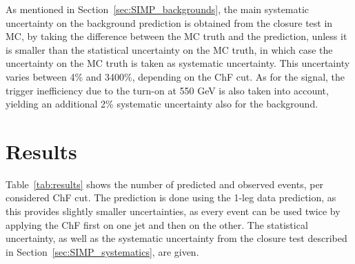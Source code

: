 As mentioned in Section~\ref{sec:SIMP_backgrounds}, the main systematic uncertainty on the background prediction is obtained from the closure test in MC, by taking the difference between the MC truth and the prediction, unless it is smaller than the statistical uncertainty on the MC truth, in which case the uncertainty on the MC truth is taken as systematic uncertainty. This uncertainty varies between 4\% and 3400\%, depending on the ChF cut. As for the signal, the trigger inefficiency due to the turn-on at 550 GeV is also taken into account, yielding an additional 2\% systematic uncertainty also for the background.

\section{Results}
\label{sec:SIMP_results}

Table~\ref{tab:results} shows the number of predicted and observed events, per considered ChF cut. The prediction is done using the 1-leg data prediction, as this provides slightly smaller uncertainties, as every event can be used twice by applying the ChF first on one jet and then on the other. The statistical uncertainty, as well as the systematic uncertainty from the closure test described in Section~\ref{sec:SIMP_systematics}, are given.

